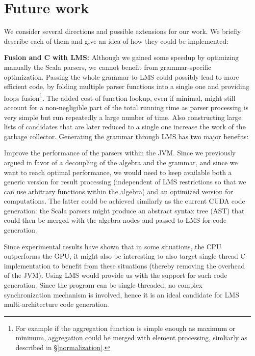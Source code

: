 \section{Future work}
We consider several directions and possible extensions for our work. We briefly describe each of them and give an idea of how they could be implemented:\ol

\item \textbf{Fusion and C with LMS:} Although we gained some speedup by optimizing manually the Scala parsers, we cannot benefit from grammar-specific optimization. Passing the whole grammar to LMS could possibly lead to more efficient code, by folding multiple parser functions into a single one and providing loops fusion\footnote{For example if the aggregation function is simple enough as maximum or minimum, aggregation could be merged with element processing, simliarly as described in \S\ref{normalization}.}. The added cost of function lookup, even if minimal, might still account for a non-negligible part of the total running time as parser processing is very simple but run repeatedly a large number of time. Also constructing large lists of candidates that are later reduced to a single one  increase the work of the garbage collector. Generating the grammar through LMS has two major benefits:\ol
\item Improve the performance of the parsers within the JVM. Since we previously argued in favor of a decoupling of the algebra and the grammar, and since we want to reach optimal performance, we would need to keep available both a generic version for result processing (independent of LMS restrictions so that we can use arbitrary functions within the algebra) and an optimized version for computations. The latter could be achieved similarly as the current CUDA code generation: the Scala parsers might produce an abstract syntax tree (AST) that could then be merged with the algebra nodes and passed to LMS for code generation.
\item Since experimental results have shown that in some situations, the CPU outperforms the GPU, it might also be interesting to also target single thread C implementation to benefit from these situations (thereby removing the overhead of the JVM). Using LMS would provide us with the support for such code generation. Since the program can be single threaded, no complex synchronization mechanism is involved, hence it is an ideal candidate for LMS multi-architecture code generation. 
